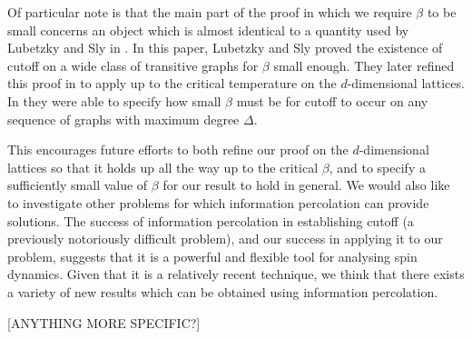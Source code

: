 Of particular note is that the main part of the proof in which we require $\beta$ to be small concerns an object which is almost identical to a quantity used by Lubetzky and Sly in \cite{Lubetzky2015-po}. In this paper, Lubetzky and Sly proved the existence of cutoff on a wide class of transitive graphs for $\beta$ small enough. They later refined this proof in \cite{Lubetzky2016-wd} to apply up to the critical temperature on the $d$-dimensional lattices. In \cite{Lubetzky2017-nc} they were able to specify how small $\beta$ must be for cutoff to occur on any sequence of graphs with maximum degree $\Delta$.

This encourages future efforts to both refine our proof on the $d$-dimensional lattices so that it holds up all the way up to the critical $\beta$, and to specify a sufficiently small value of $\beta$ for our result to hold in general.
We would also like to investigate other problems for which information percolation can provide solutions. The success of information percolation in establishing cutoff (a previously notoriously difficult problem), and our success in applying it to our problem, suggests that it is a powerful and flexible tool for analysing spin dynamics. Given that it is a relatively recent technique, we think that there exists a variety of new results which can be obtained using information percolation.

[ANYTHING MORE SPECIFIC?]